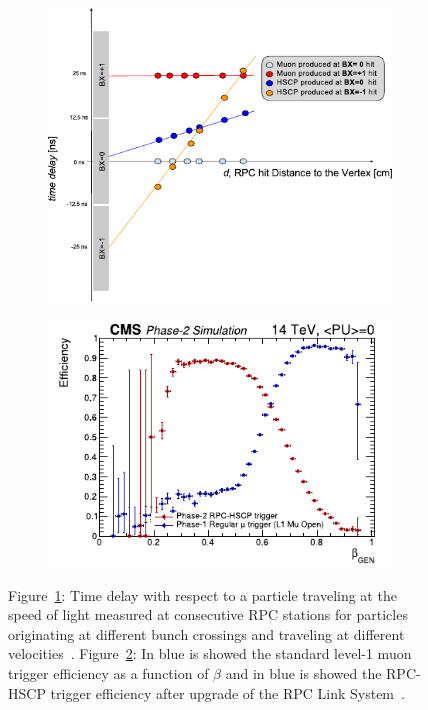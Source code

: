 	\begin{figure}[H]
		\begin{subfigure}{0.5\linewidth}
			\centering
			\includegraphics[width = \linewidth]{fig/chapt3/HSCP-RPC-trigger-time.pdf}
			\caption{\label{fig:HSCP-trigger:A}}
		\end{subfigure}
		\begin{subfigure}{0.5\linewidth}
			\centering
			\includegraphics[width = \linewidth]{fig/chapt3/HSCP-RPC-trigger-efficiency.pdf}
			\caption{\label{fig:HSCP-trigger:B}}
		\end{subfigure}
		\caption{\label{fig:HSCP-trigger} Figure~\ref{fig:HSCP-trigger:A}: Time delay with respect to a particle traveling at the speed of light measured at consecutive RPC stations for particles originating at different bunch crossings and traveling at different velocities~\cite{PHASEIITP}. Figure~\ref{fig:HSCP-trigger:B}: In blue is showed the standard level-1 muon trigger efficiency as a function of $\beta$ and in blue is showed the RPC-HSCP trigger efficiency after upgrade of the RPC Link System~\cite{PHASEIITP}.}
	\end{figure}
	
